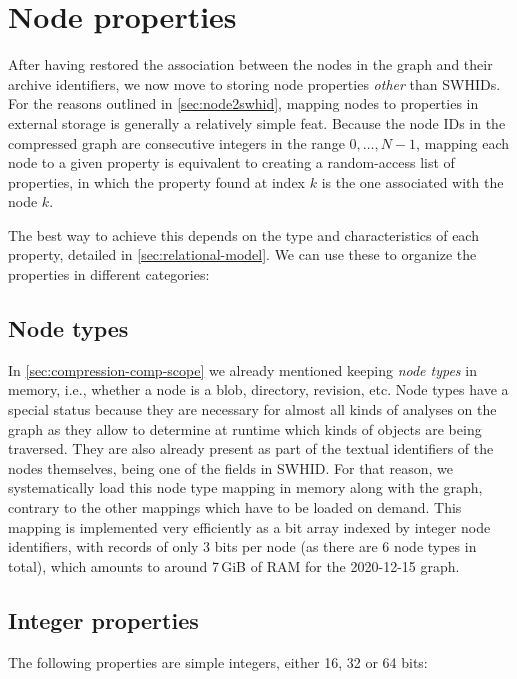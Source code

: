 \section{Node properties}%
\label{sec:node-properties}

After having restored the association between the nodes in the graph and their
archive identifiers, we now move to storing node properties \emph{other} than
\glspl{SWHID}.
For the reasons outlined in \cref{sec:node2swhid}, mapping nodes to properties
in external storage is generally a relatively simple feat. Because the node IDs
in the compressed graph are consecutive integers in the range ${0,\ldots,N-1}$,
mapping each node to a given property is equivalent to creating a random-access
list of properties, in which the property found at index $k$ is the one
associated with the node $k$.

The best way to achieve this depends on the type and characteristics of each
property, detailed in \cref{sec:relational-model}. We can use these to organize
the properties in different categories:

\subsection{Node types}%
\label{sec:mapping-types}

In \cref{sec:compression-comp-scope} we already mentioned keeping \emph{node
types} in memory, i.e., whether a node is a blob, directory, revision, etc.
Node types have a special status because they are necessary for almost all
kinds of analyses on the graph as they allow to determine at runtime which
kinds of objects are being traversed. They are also
already present as part of the textual identifiers of the nodes themselves,
being one of the fields in \gls{SWHID}. For that reason, we systematically
load this node type mapping in memory along with the graph, contrary to the
other mappings which have to be loaded on demand.
This mapping is implemented very efficiently as a bit array indexed by integer
node identifiers, with records of only 3 bits per node (as there are 6 node
types in total), which amounts to around 7\,GiB of RAM for the 2020-12-15
graph.

\subsection{Integer properties}%
\label{sec:mapping-integers}

The following properties are simple integers, either 16, 32 or 64 bits:

